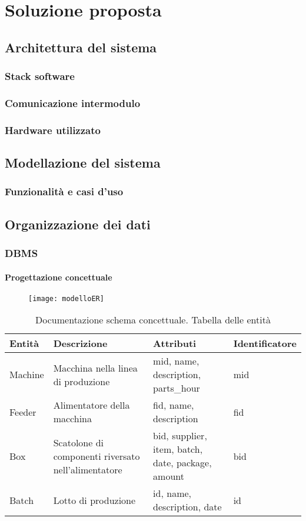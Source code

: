 \section{Soluzione proposta}
\label{sec:soluzione}

\subsection{Architettura del sistema}
\subsubsection{Stack software}
\subsubsection{Comunicazione intermodulo}
\subsubsection{Hardware utilizzato}

\subsection{Modellazione del sistema}
\subsubsection{Funzionalità e casi d'uso}

\subsection{Organizzazione dei dati}
\subsubsection{DBMS}
\paragraph{Progettazione concettuale}
\begin{figure}
\centering
\texttt{[image: modelloER]}
\caption{}
\label{}
\end{figure}
\begin{table}[h!]
\centering
\begin{tabular}{| l | p{3cm} | p{3cm} | p{3cm} |}
\hline Entità & Descrizione & Attributi & Identificatore\\
\hline Machine & Macchina nella linea di produzione & mid, name, description, parts\_hour & mid\\
\hline Feeder & Alimentatore della macchina & fid, name, description & fid\\
\hline Box & Scatolone di componenti riversato nell'alimentatore & bid, supplier, item, batch, date, package, amount & bid\\
\hline Batch & Lotto di produzione & id, name, description, date & id\\
\hline
\end{tabular}
\label{tab:erentity}
\caption[Documentazione ER: entità]{Documentazione schema concettuale. Tabella delle entità}
\end{table}
